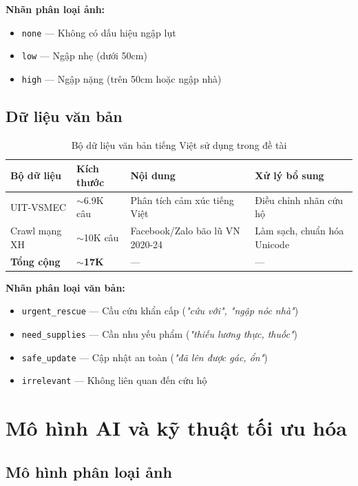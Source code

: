 \documentclass[12pt, a4paper]{report}
\newcommand{\tech}[1]{\texttt{#1}}
\begin{document}
\textbf{Nhãn phân loại ảnh:}
\begin{itemize}
  \item \tech{none} — Không có dấu hiệu ngập lụt
  \item \tech{low} — Ngập nhẹ (dưới 50cm)
  \item \tech{high} — Ngập nặng (trên 50cm hoặc ngập nhà)
\end{itemize}

\subsection{Dữ liệu văn bản}

\begin{table}[H]
\centering
\caption{Bộ dữ liệu văn bản tiếng Việt sử dụng trong đề tài}
\label{tab:text-datasets}
\begin{tabular}{llp{4.5cm}p{3.5cm}}
\toprule
\textbf{Bộ dữ liệu} & \textbf{Kích thước} & \textbf{Nội dung} & \textbf{Xử lý bổ sung} \\
\midrule
UIT-VSMEC
  & $\sim$6.9K câu & Phân tích cảm xúc tiếng Việt & Điều chỉnh nhãn cứu hộ \\
Crawl mạng XH
  & $\sim$10K câu & Facebook/Zalo bão lũ VN 2020-24 & Làm sạch, chuẩn hóa Unicode \\
\midrule
\textbf{Tổng cộng} & \textbf{$\sim$17K} & — & — \\
\bottomrule
\end{tabular}
\end{table}

\textbf{Nhãn phân loại văn bản:}
\begin{itemize}
  \item \tech{urgent\_rescue} — Cầu cứu khẩn cấp (\textit{"cứu với", "ngập nóc nhà"})
  \item \tech{need\_supplies} — Cần nhu yếu phẩm (\textit{"thiếu lương thực, thuốc"})
  \item \tech{safe\_update} — Cập nhật an toàn (\textit{"đã lên được gác, ổn"})
  \item \tech{irrelevant} — Không liên quan đến cứu hộ
\end{itemize}

\section{Mô hình AI và kỹ thuật tối ưu hóa}

\subsection{Mô hình phân loại ảnh}
\end{document}
